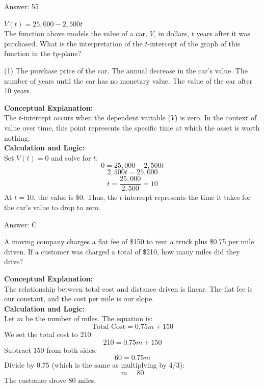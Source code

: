 \documentclass[11pt,paper=a4,answers]{exam}
\begin{document}
\begin{questions}
\begin{solution}
\vspace{15pt}
Answer: \colorbox{yellow!100}{55}
\end{solution}

\question
$V(t) = 25,000 - 2,500t$ \\
The function above models the value of a car, $V$, in dollars, $t$ years after it was purchased. What is the interpretation of the $t$-intercept of the graph of this function in the $ty$-plane?
\begin{tasks}(1)
    \task The purchase price of the car.
    \task The annual decrease in the car's value.
    \task The number of years until the car has no monetary value.
    \task The value of the car after 10 years.
\end{tasks}

\begin{solution}
\textbf{Conceptual Explanation:} \\
The $t$-intercept occurs when the dependent variable ($V$) is zero. In the context of value over time, this point represents the specific time at which the asset is worth nothing.
\\[10pt]
\textbf{Calculation and Logic:} \\
Set $V(t) = 0$ and solve for $t$:
\[0 = 25,000 - 2,500t\]
\[2,500t = 25,000\]
\[t = \frac{25,000}{2,500} = 10\]
At $t = 10$, the value is \$0. Thus, the $t$-intercept represents the time it takes for the car's value to drop to zero.

\vspace{15pt}
Answer: \colorbox{yellow!100}{C}
\end{solution}

\question
A moving company charges a flat fee of \$150 to rent a truck plus \$0.75 per mile driven. If a customer was charged a total of \$210, how many miles did they drive?

\begin{solution}
\textbf{Conceptual Explanation:} \\
The relationship between total cost and distance driven is linear. The flat fee is our constant, and the cost per mile is our slope.
\\[10pt]
\textbf{Calculation and Logic:} \\
Let $m$ be the number of miles. The equation is:
\[\text{Total Cost} = 0.75m + 150\]
We set the total cost to 210:
\[210 = 0.75m + 150\]
Subtract 150 from both sides:
\[60 = 0.75m\]
Divide by 0.75 (which is the same as multiplying by 4/3):
\[m = 80\]
The customer drove 80 miles.


\end{solution}
\end{questions}
\end{document}
